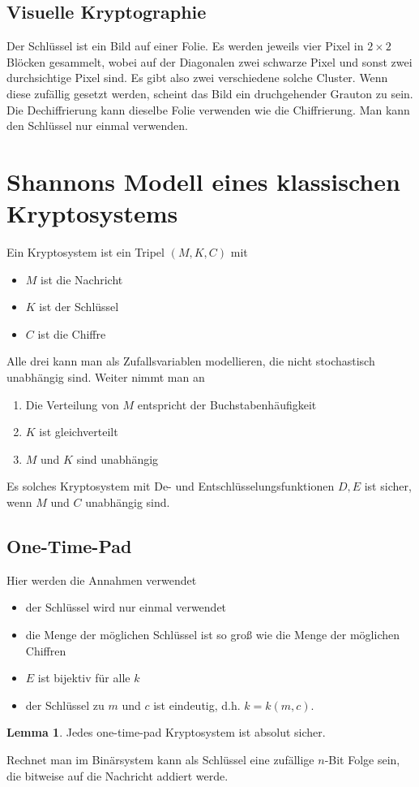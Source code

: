 \documentclass[a4paper, 12pt]{article}
\theoremstyle{plain}
\theoremstyle{definition}
\theoremstyle{lemma}
\newtheorem{lemma}[theorem]{Lemma}
\theoremstyle{remark}
\theoremstyle{corollary}
\theoremstyle{example}
\begin{document}
	\subsection{Visuelle Kryptographie}
	Der Schlüssel ist ein Bild auf einer Folie. Es werden jeweils vier Pixel in $2\times 2$ Blöcken gesammelt, wobei auf der Diagonalen zwei schwarze Pixel und sonst zwei durchsichtige Pixel sind. Es gibt also zwei verschiedene solche Cluster. Wenn diese zufällig gesetzt werden, scheint das Bild ein druchgehender Grauton zu sein. Die Dechiffrierung kann dieselbe Folie verwenden wie die Chiffrierung. Man kann den Schlüssel nur einmal verwenden.
	\section{Shannons Modell eines klassischen Kryptosystems}
	Ein Kryptosystem ist ein Tripel $(M,K,C)$ mit \begin{itemize}
		\item $M$ ist die Nachricht
		\item $K$ ist der Schlüssel
		\item $C$ ist die Chiffre
	\end{itemize}
	Alle drei kann man als Zufallsvariablen modellieren, die nicht stochastisch unabhängig sind. Weiter nimmt man an 
	\begin{enumerate}
		\item Die Verteilung von $M$ entspricht der Buchstabenhäufigkeit
		\item $K$ ist gleichverteilt
		\item $M$ und $K$ sind unabhängig
	\end{enumerate}
	Es solches Kryptosystem mit De- und Entschlüsselungsfunktionen $D,E$ ist sicher, wenn $M$ und $C$ unabhängig sind.
	\subsection{One-Time-Pad}
	Hier werden die Annahmen verwendet \begin{itemize}
		\item der Schlüssel wird nur einmal verwendet
		\item die Menge der möglichen Schlüssel ist so groß wie die Menge der möglichen Chiffren
		\item $E$ ist bijektiv für alle $k$
		\item der Schlüssel zu $m$ und $c$ ist eindeutig, d.h. $k = k(m,c)$.
	\end{itemize}
	\begin{lemma}
		Jedes one-time-pad Kryptosystem ist absolut sicher.
	\end{lemma}
	Rechnet man im Binärsystem kann als Schlüssel eine zufällige $n$-Bit Folge sein, die bitweise auf die Nachricht addiert werde. 
\end{document}
